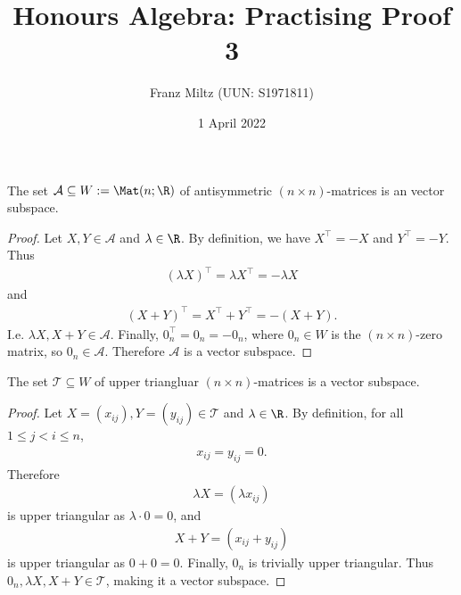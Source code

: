 \documentclass{article}
\begin{document}
\title{Honours Algebra: Practising Proof 3}
\author{Franz Miltz (UUN: S1971811)}
\date{1 April 2022}
\maketitle
\begin{claim*}[1a]
	The set $\mathcal{A}\subseteq W:=\Mat(n;\R)$ of antisymmetric $(n\times n)$-matrices is an
	vector subspace.
	\begin{proof}
		Let $X,Y\in\mathcal{A}$ and $\lambda\in\R$. By definition, we have $X^\top=-X$ and $Y^\top=-Y$.
		Thus
		\begin{align*}
			(\lambda X)^\top = \lambda X^\top = -\lambda X
		\end{align*}
		and
		\begin{align*}
			(X+Y)^\top = X^\top + Y^\top = -(X+Y).
		\end{align*}
		I.e. $\lambda X,X+Y\in\mathcal{A}$. Finally, $0_n^\top = 0_n = -0_n$, where $0_n\in W$
		is the $(n\times n)$-zero matrix, so $0_n\in\mathcal{A}$. Therefore $\mathcal{A}$ is a vector subspace.
	\end{proof}
\end{claim*}
\begin{claim*}[1a]
	The set $\mathcal{T}\subseteq W$ of upper triangluar $(n\times n)$-matrices is a vector subspace.
	\begin{proof}
		Let $X=(x_{ij}),Y=(y_{ij})\in\mathcal{T}$ and $\lambda\in\R$. By definition, for all $1\leq j<i\leq n$,
		\begin{align*}
			x_{ij}=y_{ij}=0.
		\end{align*}
		Therefore
		\begin{align*}
			\lambda X=(\lambda x_{ij})
		\end{align*}
		is upper triangular as $\lambda\cdot 0=0$, and
		\begin{align*}
			X + Y =(x_{ij}+y_{ij})
		\end{align*}
		is upper triangular as $0+0=0$. Finally, $0_n$ is trivially upper triangular. Thus $0_n,\lambda X,X+Y\in\mathcal{T}$,
		making it a vector subspace.
	\end{proof}
\end{claim*}
\end{document}
